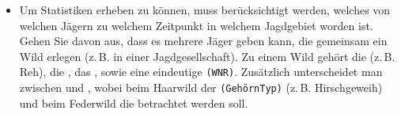 \documentclass{lehramt-informatik-aufgabe}
\begin{document}
\begin{itemize}
\item Um Statistiken erheben zu können, muss berücksichtigt werden,
welches  von welchen Jägern zu welchem Zeitpunkt in
welchem Jagdgebiet  worden ist. Gehen Sie davon
aus, dass es mehrere Jäger geben kann, die gemeinsam ein Wild erlegen
(z.\,B. in einer Jagdgesellschaft). Zu einem Wild gehört die
 (z.\,B. Reh), die , das
, sowie eine eindeutige
 \texttt{(WNR)}. Zusätzlich
unterscheidet man zwischen  und ,
wobei beim Haarwild der 
\texttt{(GehörnTyp)} (z.\,B. Hirschgeweih) und beim Federwild die
 betrachtet werden soll.
\end{itemize}
\end{document}
